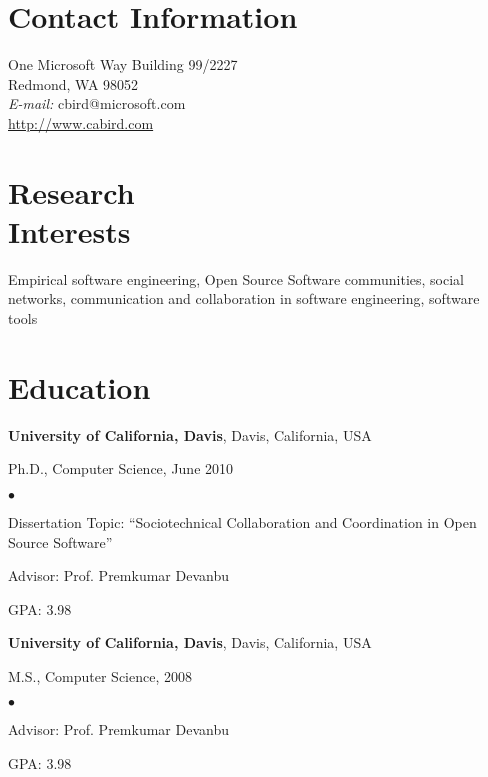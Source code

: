 \documentclass[margin,line,article,letterpaper]{res}
\newenvironment{list1}{
  \begin{list}{}{%
      \setlength{\itemsep}{0in}
      \setlength{\parsep}{0in} \setlength{\parskip}{0in}
      \setlength{\topsep}{0in} \setlength{\partopsep}{0in} 
      \setlength{\leftmargin}{0.17in}}}{\end{list}}
\newenvironment{list2}{
  \begin{list}{$\bullet$}{%
      \setlength{\itemsep}{0in}
      \setlength{\parsep}{0in} \setlength{\parskip}{0in}
      \setlength{\topsep}{0in} \setlength{\partopsep}{0in} 
      \setlength{\leftmargin}{0.2in}}}{\end{list}}
\begin{document}



\begin{resume}
\section{Contact Information}
\vspace{.05in}
One Microsoft Way
Building 99/2227\\
Redmond, WA 98052\\
{\it E-mail:}  cbird@microsoft.com\\
\url{http://www.cabird.com}
 
\section{Research \\
Interests}
Empirical software engineering, Open Source Software communities, social networks, 
communication and collaboration in software engineering, software tools

\section{Education}
\textbf{University of California, Davis}, Davis, California, USA
\begin{list1}
\item Ph.D., Computer Science, June 2010
\begin{list2}
\vspace*{.05in}
\item Dissertation Topic:  ``Sociotechnical Collaboration and Coordination in Open Source Software'' 
\item Advisor:  Prof. Premkumar Devanbu
\item GPA: 3.98
\end{list2}
\end{list1}

\textbf{University of California, Davis}, Davis, California, USA
\begin{list1}
\item M.S., Computer Science, 2008
\begin{list2}
\vspace*{.05in}
\item Advisor:  Prof. Premkumar Devanbu
\item GPA: 3.98
\end{list2}
\end{list1}


\end{resume}
\end{document}
